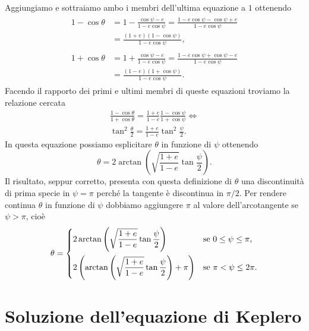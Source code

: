 Aggiungiamo e sottraiamo ambo i membri dell'ultima equazione a $1$ ottenendo
\begin{align}
  \begin{split}
    1-\cos\theta &= 1-\frac{\cos\psi-e}{1-e\cos\psi} =
    \frac{1-e\cos\psi-\cos\psi+e}{1-e\cos\psi} \\
    &= \frac{(1+e)(1-\cos\psi)}{1-e\cos\psi},
  \end{split} \\
  \begin{split}
    1+\cos\theta &= 1+\frac{\cos\psi-e}{1-e\cos\psi} =
    \frac{1-e\cos\psi+\cos\psi-e}{1-e\cos\psi} \\
    &= \frac{(1-e)(1+\cos\psi)}{1-e\cos\psi}.
  \end{split}
\end{align}
Facendo il rapporto dei primi e ultimi membri di queste equazioni troviamo
la relazione cercata
\begin{gather}
  \frac{1-\cos\theta}{1+\cos\theta} =
  \frac{1+e}{1-e}\frac{1-\cos\psi}{1+\cos\psi} \iff \\
  \tan^2\frac{\theta}{2} = \frac{1+e}{1-e}\tan^2\frac{\psi}{2}.
\end{gather}
In questa equazione possiamo esplicitare $\theta$ in funzione di $\psi$ ottenendo
\begin{equation}
  \theta = 2\arctan
  \left(
    \sqrt{\frac{1+e}{1-e}}\tan\frac{\psi}{2}
  \right).
\end{equation}
Il risultato, seppur corretto, presenta con questa definizione di $\theta$ una
discontinuità di prima specie in $\psi = \pi$ perché la tangente è discontinua
in $\pi/2$. Per rendere continua $\theta$ in funzione di $\psi$ dobbiamo
aggiungere $\pi$ al valore dell'arcotangente se $\psi > \pi$, cioè
\begin{equation}
  \label{eq:anoamlie-vera-eccentrica}
  \theta =
  \begin{dcases}
    2\arctan
    \left(
      \sqrt{\frac{1+e}{1-e}}\tan\frac{\psi}{2}
    \right) & \text{se $0 \leq \psi \leq \pi$,} \\
    2
    \left(
      \arctan
      \left(
        \sqrt{\frac{1+e}{1-e}}\tan\frac{\psi}{2}
      \right) + \pi
    \right) & \text{se $\pi < \psi \leq 2\pi$.}
  \end{dcases}
\end{equation}

\section{Soluzione dell'equazione di Keplero}
\label{sec:soluzione-keplero}

